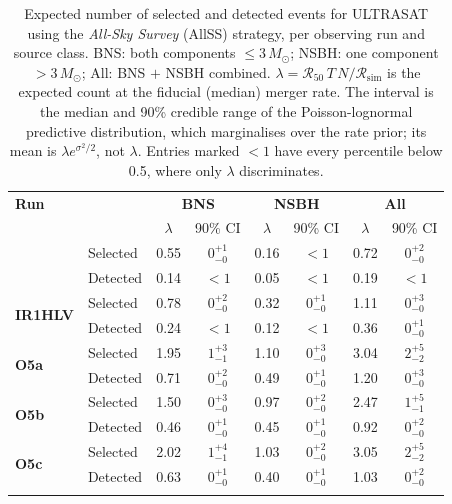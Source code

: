 \begin{table}
\renewcommand\arraystretch{1.3}
\setlength{\tabcolsep}{0.3cm}
\centering
\caption{Expected number of selected and detected events for ULTRASAT using the \emph{All-Sky Survey} (AllSS) strategy, per observing run and source class. BNS: both components $\leq 3\,M_\odot$; NSBH: one component $> 3\,M_\odot$; All: BNS $+$ NSBH combined. $\lambda = \mathcal{R}_{50}\,T\,N / \mathcal{R}_{\mathrm{sim}}$ is the expected count at the fiducial (median) merger rate. The interval is the median and 90\% credible range of the Poisson-lognormal predictive distribution, which marginalises over the rate prior; its mean is $\lambda e^{\sigma^2/2}$, not $\lambda$. Entries marked $<1$ have every percentile below 0.5, where only $\lambda$ discriminates.}
\label{tab:ultrasat-allsky-selected-detected-1yr}
\begin{tabular}{llcccccc}
\Xhline{3\arrayrulewidth}
\textbf{Run} & & \multicolumn{2}{c}{\textbf{BNS}} & \multicolumn{2}{c}{\textbf{NSBH}} & \multicolumn{2}{c}{\textbf{All}} \\
 & & $\lambda$ & 90\% CI & $\lambda$ & 90\% CI & $\lambda$ & 90\% CI \\
\Xhline{3\arrayrulewidth}
\multirow{2}{*}{\textbf{IR1HL}} & Selected & 0.55 & $0^{+1}_{-0}$ & 0.16 & $<1$ & 0.72 & $0^{+2}_{-0}$ \\
 & Detected & 0.14 & $<1$ & 0.05 & $<1$ & 0.19 & $<1$ \\
\hline
\multirow{2}{*}{\textbf{IR1HLV}} & Selected & 0.78 & $0^{+2}_{-0}$ & 0.32 & $0^{+1}_{-0}$ & 1.11 & $0^{+3}_{-0}$ \\
 & Detected & 0.24 & $<1$ & 0.12 & $<1$ & 0.36 & $0^{+1}_{-0}$ \\
\hline
\multirow{2}{*}{\textbf{O5a}} & Selected & 1.95 & $1^{+3}_{-1}$ & 1.10 & $0^{+3}_{-0}$ & 3.04 & $2^{+5}_{-2}$ \\
 & Detected & 0.71 & $0^{+2}_{-0}$ & 0.49 & $0^{+1}_{-0}$ & 1.20 & $0^{+3}_{-0}$ \\
\hline
\multirow{2}{*}{\textbf{O5b}} & Selected & 1.50 & $0^{+3}_{-0}$ & 0.97 & $0^{+2}_{-0}$ & 2.47 & $1^{+5}_{-1}$ \\
 & Detected & 0.46 & $0^{+1}_{-0}$ & 0.45 & $0^{+1}_{-0}$ & 0.92 & $0^{+2}_{-0}$ \\
\hline
\multirow{2}{*}{\textbf{O5c}} & Selected & 2.02 & $1^{+4}_{-1}$ & 1.03 & $0^{+2}_{-0}$ & 3.05 & $2^{+5}_{-2}$ \\
 & Detected & 0.63 & $0^{+1}_{-0}$ & 0.40 & $0^{+1}_{-0}$ & 1.03 & $0^{+2}_{-0}$ \\
\Xhline{3\arrayrulewidth}
\end{tabular}
\end{table}
